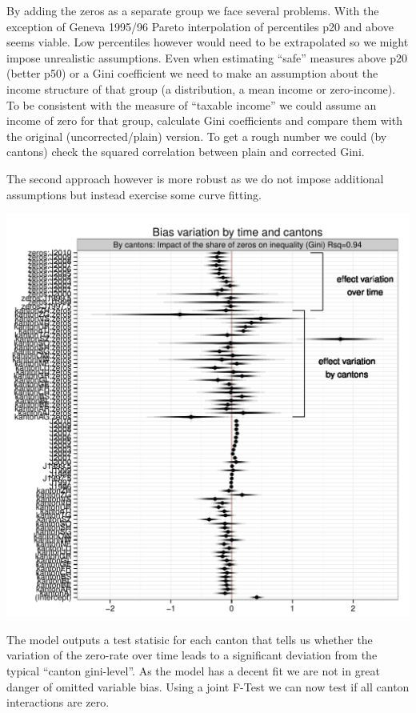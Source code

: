 \documentclass[twoside]{article}\usepackage[]{graphicx}\usepackage[]{color}
\makeatletter
\def\maxwidth{ %
  \ifdim\Gin@nat@width>\linewidth
    \linewidth
  \else
    \Gin@nat@width
  \fi
}
\newenvironment{knitrout}{}{} %
\makeatother
\begin{document}
\begin{multicols}{2}
By adding the zeros as a separate group we face several problems. With the exception of Geneva 1995/96 Pareto interpolation of percentiles p20 and above seems viable. Low percentiles however would need to be extrapolated so we might impose unrealistic assumptions. Even when estimating ``safe'' measures above p20 (better p50) or a Gini coefficient we need to make an assumption about the income structure of that group (a distribution, a mean income or zero-income). To be consistent with the measure of ``taxable income'' we could assume an income of zero for that group, calculate Gini coefficients and compare them with the original (uncorrected/plain) version. To get a rough number we could (by cantons) check the squared correlation between plain and corrected Gini.

The second approach however is more robust as we do not impose additional assumptions but instead exercise some curve fitting.

\begin{knitrout}
\color{fgcolor}
\includegraphics[width=\maxwidth]{figure/corrected_gini} 

\end{knitrout}


The model outputs a test statisic for each canton that tells us whether the variation of the zero-rate over time leads to a significant deviation from the typical ``canton gini-level''. As the model has a decent fit we are not in great danger of omitted variable bias. Using a joint F-Test we can now test if all canton interactions are zero. 





\end{multicols}
\end{document}
